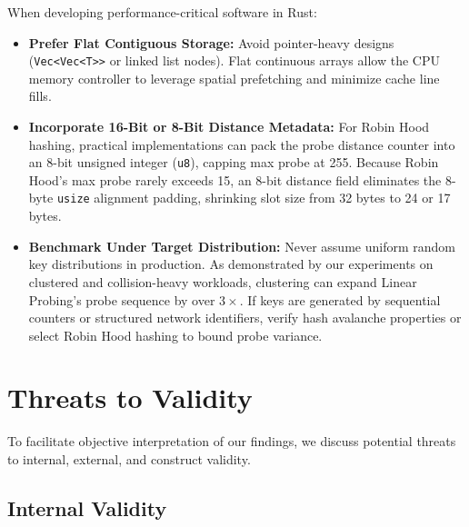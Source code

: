 \documentclass[conference]{IEEEtran}
\begin{document}
When developing performance-critical software in Rust:
\begin{itemize}
  \item \textbf{Prefer Flat Contiguous Storage:} Avoid pointer-heavy designs (\texttt{Vec<Vec<T>>} or linked list nodes). Flat continuous arrays allow the CPU memory controller to leverage spatial prefetching and minimize cache line fills.
  \item \textbf{Incorporate 16-Bit or 8-Bit Distance Metadata:} For Robin Hood hashing, practical implementations can pack the probe distance counter into an 8-bit unsigned integer (\texttt{u8}), capping max probe at 255. Because Robin Hood's max probe rarely exceeds 15, an 8-bit distance field eliminates the 8-byte \texttt{usize} alignment padding, shrinking slot size from 32 bytes to 24 or 17 bytes.
  \item \textbf{Benchmark Under Target Distribution:} Never assume uniform random key distributions in production. As demonstrated by our experiments on clustered and collision-heavy workloads, clustering can expand Linear Probing's probe sequence by over $3\times$. If keys are generated by sequential counters or structured network identifiers, verify hash avalanche properties or select Robin Hood hashing to bound probe variance.
\end{itemize}

\section{Threats to Validity}

To facilitate objective interpretation of our findings, we discuss potential threats to internal, external, and construct validity.

\subsection{Internal Validity}
\end{document}
